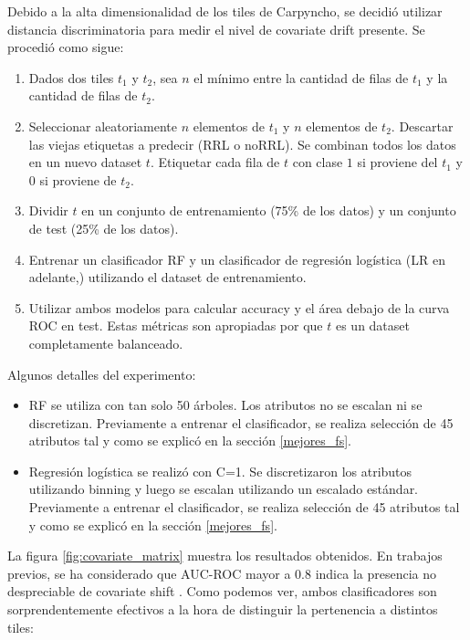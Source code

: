 Debido a la alta dimensionalidad de los tiles de Carpyncho, se decidió utilizar distancia discriminatoria para medir el nivel de covariate drift presente. Se procedió como sigue:

\begin{enumerate}
\item Dados dos tiles $t_1$ y $t_2$, sea $n$ el mínimo entre la cantidad de filas de $t_1$ y la cantidad de filas de $t_2$. 
\item Seleccionar aleatoriamente $n$ elementos de $t_1$ y $n$ elementos de $t_2$. Descartar las viejas etiquetas a predecir (RRL o noRRL). Se combinan todos los datos en un nuevo dataset $t$. Etiquetar cada fila de $t$ con clase $1$ si proviene del $t_1$ y $0$ si proviene de $t_2$. 
\item Dividir $t$ en un conjunto de entrenamiento (75\% de los datos) y un conjunto de test (25\% de los datos).
\item Entrenar un clasificador RF y un clasificador de regresión logística (LR en adelante,\cite{statisticallearning}) utilizando el dataset de entrenamiento.
\item Utilizar ambos modelos para calcular accuracy y el área debajo de la curva ROC en test. Estas métricas son apropiadas por que $t$ es un dataset completamente balanceado.
\end{enumerate}

Algunos detalles del experimento:

\begin{itemize}
\item RF se utiliza con tan solo 50 árboles. Los atributos no se escalan ni se discretizan. Previamente a entrenar el clasificador, se realiza selección de 45 atributos tal y como se explicó en la sección \ref{mejores_fs}.
\item Regresión logística se realizó con C=1. Se discretizaron los atributos utilizando binning y luego se escalan utilizando un escalado estándar. Previamente a entrenar el clasificador, se realiza selección de 45 atributos tal y como se explicó en la sección \ref{mejores_fs}.
\end{itemize}

La figura \ref{fig:covariate_matrix} muestra los resultados obtenidos. En trabajos previos, se ha considerado que AUC-ROC mayor a 0.8 indica la presencia no despreciable de covariate shift \cite{GeetaDharani2019CovariateSA}. Como podemos ver, ambos clasificadores son sorprendentemente efectivos a la hora de distinguir la pertenencia a distintos tiles:

